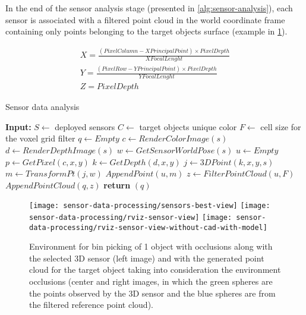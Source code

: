 In the end of the sensor analysis stage (presented in \cref{alg:sensor-analysis}), each sensor is associated with a filtered point cloud in the world coordinate frame containing only points belonging to the target objects surface (example in \cref{fig:sensor-data-processing}).

\footnotesize
\begin{equation}\label{eq:pointcloud}
	\begin{split}
		X = \frac{(PixelColumn - XPrincipalPoint) \times PixelDepth}{XFocalLenght}\\
		Y = \frac{(PixelRow - YPrincipalPoint) \times PixelDepth}{YFocalLenght}\\
		Z = PixelDepth
	\end{split}
\end{equation}
\normalsize

\begin{algorithm}
	\caption{Sensor data analysis}
	\label{alg:sensor-analysis}
	\begin{algorithmic}[1]
		\State \textbf{Input:}
		\State $S \gets$ deployed sensors
		\State $C \gets$ target objects unique color
		\State $F \gets$ cell size for the voxel grid filter
			\State $q \gets Empty$
				\State $c \gets RenderColorImage(s)$
				\State $d \gets RenderDepthImage(s)$
				\State $w \gets GetSensorWorldPose(s)$
				\State $u \gets Empty$
						\State $p \gets GetPixel(c,x,y)$
							\State $k \gets GetDepth(d,x,y)$
								\State $j \gets 3DPoint(k,x,y,s)$
								\State $m \gets TransformPt(j,w)$
								\State $AppendPoint(u,m)$
							\EndIf
						\EndIf
					\EndFor
				\EndFor
				\State $z \gets FilterPointCloud(u,F)$
				\State $AppendPointCloud(q,z)$
			\EndFor
			\State \textbf{return} $(q)$
		\EndProcedure
	\end{algorithmic}
\end{algorithm}

\begin{figure}
	\centering
	\texttt{[image: sensor-data-processing/sensors-best-view]}
	\texttt{[image: sensor-data-processing/rviz-sensor-view]}
	\texttt{[image: sensor-data-processing/rviz-sensor-view-without-cad-with-model]}
	\caption{Environment for bin picking of 1 object with occlusions along with the selected 3D sensor (left image) and with the generated point cloud for the target object taking into consideration the environment occlusions (center and right images, in which the green spheres are the points observed by the 3D sensor and the blue spheres are from the filtered reference point cloud).}
	\label{fig:sensor-data-processing}
\end{figure}


